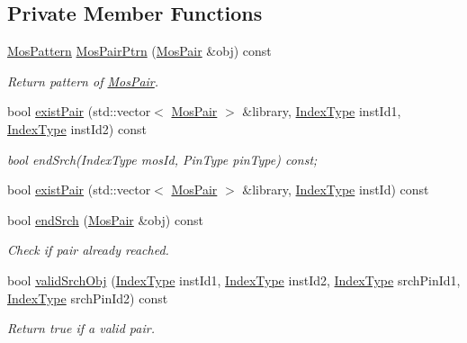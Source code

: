 \subsection*{Private Member Functions}
\begin{DoxyCompactItemize}
\item 
\hyperlink{type_8h_af19eddb079bfea723256710b029c38e8}{Mos\+Pattern} \hyperlink{classSymDetect_aa832e51051f0ed9d3643c72b1d738684}{Mos\+Pair\+Ptrn} (\hyperlink{classMosPair}{Mos\+Pair} \&obj) const
\begin{DoxyCompactList}\small\item\em Return pattern of \hyperlink{classMosPair}{Mos\+Pair}. \end{DoxyCompactList}\item 
bool \hyperlink{classSymDetect_a245b48760c705d4ad9b2bad39012030e}{exist\+Pair} (std\+::vector$<$ \hyperlink{classMosPair}{Mos\+Pair} $>$ \&library, \hyperlink{type_8h_a581e8093e28e7362f2b6937296190676}{Index\+Type} inst\+Id1, \hyperlink{type_8h_a581e8093e28e7362f2b6937296190676}{Index\+Type} inst\+Id2) const
\begin{DoxyCompactList}\small\item\em bool end\+Srch(\+Index\+Type mos\+Id, Pin\+Type pin\+Type) const; \end{DoxyCompactList}\item 
bool \hyperlink{classSymDetect_a72b24ce0ad3992c207f5023250dd1d5a}{exist\+Pair} (std\+::vector$<$ \hyperlink{classMosPair}{Mos\+Pair} $>$ \&library, \hyperlink{type_8h_a581e8093e28e7362f2b6937296190676}{Index\+Type} inst\+Id) const
\item 
bool \hyperlink{classSymDetect_ac46824a93f71489b6c9f1aec961a0f8d}{end\+Srch} (\hyperlink{classMosPair}{Mos\+Pair} \&obj) const
\begin{DoxyCompactList}\small\item\em Check if pair already reached. \end{DoxyCompactList}\item 
bool \hyperlink{classSymDetect_ad4636f69ae0cad2fc23be2472c59ff4c}{valid\+Srch\+Obj} (\hyperlink{type_8h_a581e8093e28e7362f2b6937296190676}{Index\+Type} inst\+Id1, \hyperlink{type_8h_a581e8093e28e7362f2b6937296190676}{Index\+Type} inst\+Id2, \hyperlink{type_8h_a581e8093e28e7362f2b6937296190676}{Index\+Type} srch\+Pin\+Id1, \hyperlink{type_8h_a581e8093e28e7362f2b6937296190676}{Index\+Type} srch\+Pin\+Id2) const
\begin{DoxyCompactList}\small\item\em Return true if a valid pair. \end{DoxyCompactList}\item 

\end{DoxyCompactItemize}
